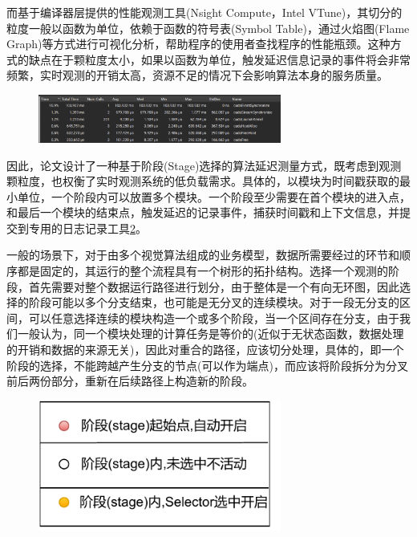 \documentclass[master,anonymous]{shtthesis}
\begin{document}
而基于编译器层提供的性能观测工具(Nsight Compute，Intel VTune\cite{reinders2005vtune})，其切分的粒度一般以函数为单位，依赖于函数的符号表(Symbol Table)，通过火焰图(Flame Graph)\cite{gregg2016flame}等方式进行可视化分析，帮助程序的使用者查找程序的性能瓶颈。这种方式的缺点在于颗粒度太小，如果以函数为单位，触发延迟信息记录的事件将会非常频繁，实时观测的开销太高，资源不足的情况下会影响算法本身的服务质量。
\begin{figure}[htbp]
	\centering
	\includegraphics[width=8cm]{img/nsight_func.png}
	\label{NsightCompute的观测结果}
\end{figure}


因此，论文设计了一种基于阶段(Stage)选择的算法延迟测量方式，既考虑到观测颗粒度，也权衡了实时观测系统的低负载需求。具体的，以模块为时间戳获取的最小单位，一个阶段内可以放置多个模块。一个阶段至少需要在首个模块的进入点，和最后一个模块的结束点，触发延迟的记录事件，捕获时间戳和上下文信息，并提交到专用的日志记录工具\ref{论文观测机制示意图图例}。

一般的场景下，对于由多个视觉算法组成的业务模型，数据所需要经过的环节和顺序都是固定的，其运行的整个流程具有一个树形的拓扑结构。选择一个观测的阶段，首先需要对整个数据运行路径进行划分，由于整体是一个有向无环图，因此选择的阶段可能以多个分支结束，也可能是无分叉的连续模块。对于一段无分支的区间，可以任意选择连续的模块构造一个或多个阶段，当一个区间存在分支，由于我们一般认为，同一个模块处理的计算任务是等价的(近似于无状态函数，数据处理的开销和数据的来源无关)，因此对重合的路径，应该切分处理，具体的，即一个阶段的选择，不能跨越产生分支的节点(可以作为端点)，而应该将阶段拆分为分叉前后两份部分，重新在后续路径上构造新的阶段。

\begin{figure}[htbp]
	\centering
	\includegraphics[width=8cm]{img/trace_l.pdf}
	\label{论文观测机制示意图图例}
\end{figure}
\end{document}
